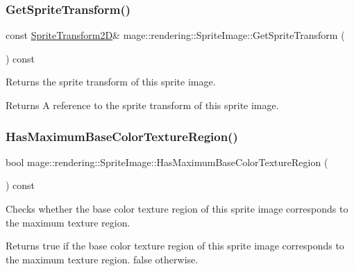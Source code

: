 \subsubsection{\texorpdfstring{Get\+Sprite\+Transform()}{GetSpriteTransform()}\hspace{0.1cm}{\footnotesize\ttfamily [2/2]}}
{\footnotesize\ttfamily const \mbox{\hyperlink{classmage_1_1_sprite_transform2_d}{Sprite\+Transform2D}}\& mage\+::rendering\+::\+Sprite\+Image\+::\+Get\+Sprite\+Transform (\begin{DoxyParamCaption}{ }\end{DoxyParamCaption}) const\hspace{0.3cm}{\ttfamily [noexcept]}}

Returns the sprite transform of this sprite image.

\begin{DoxyReturn}{Returns}
A reference to the sprite transform of this sprite image. 
\end{DoxyReturn}
\mbox{\label{classmage_1_1rendering_1_1_sprite_image_a89e9dd78d50c2c312e06686bcc7347c1}} 
\subsubsection{\texorpdfstring{Has\+Maximum\+Base\+Color\+Texture\+Region()}{HasMaximumBaseColorTextureRegion()}}
{\footnotesize\ttfamily bool mage\+::rendering\+::\+Sprite\+Image\+::\+Has\+Maximum\+Base\+Color\+Texture\+Region (\begin{DoxyParamCaption}{ }\end{DoxyParamCaption}) const\hspace{0.3cm}{\ttfamily [noexcept]}}

Checks whether the base color texture region of this sprite image corresponds to the maximum texture region.

\begin{DoxyReturn}{Returns}
{\ttfamily true} if the base color texture region of this sprite image corresponds to the maximum texture region. {\ttfamily false} otherwise. 
\end{DoxyReturn}
\mbox{\label{classmage_1_1rendering_1_1_sprite_image_acf6e19eaf380ea76e4361778693facf2}} 
